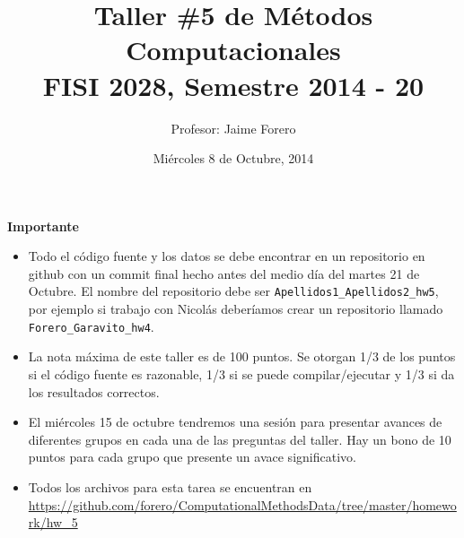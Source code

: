 \documentclass{article}
\title{Taller \#5 de M\'etodos Computacionales\\ FISI 2028, Semestre 2014 - 20}
\author{Profesor: Jaime Forero}
\date{Mi\'ercoles 8 de Octubre, 2014}
\begin{document}
\maketitle
\thispagestyle{empty}


{\bf Importante}
\begin{itemize}

\item Todo el c\'odigo fuente y los datos se debe encontrar en un
  repositorio en github con un commit final hecho antes del medio
  d\'ia del martes 21 de Octubre. El nombre del repositorio debe ser
  \verb"Apellidos1_Apellidos2_hw5", por ejemplo si trabajo con
  Nicol\'as deber\'iamos crear un repositorio llamado
  \verb"Forero_Garavito_hw4".  

\item 
  La nota m\'axima de este taller es de 100 puntos. Se otorgan 1/3
  de los puntos si el c\'odigo fuente es razonable, 1/3 si se puede
  compilar/ejecutar y 1/3 si da los resultados correctos.  

\item
  El mi\'ercoles 15 de octubre tendremos una sesi\'on para presentar
  avances de diferentes grupos en cada una de las preguntas del
  taller. Hay un bono de 10 puntos para cada grupo que presente un
  avace significativo.  

\item 
  Todos los archivos para esta tarea se encuentran en
  \url{https://github.com/forero/ComputationalMethodsData/tree/master/homework/hw_5} 

\end{itemize}
\end{document}

